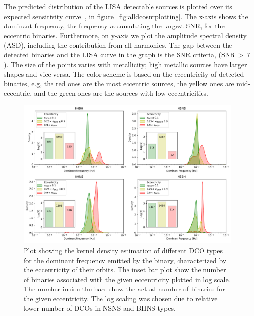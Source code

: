 \documentclass[journal, twocolumn]{IEEEtran}
\begin{document}
    The predicted distribution of the LISA detectable sources is plotted over its expected sensitivity curve~\cite{Robson2019}, in figure~\ref{fig:alldcosnrplotting}.
    The x-axis shows the dominant frequency, the frequency accumulating the largest SNR, for the eccentric binaries.
    Furthermore, on y-axis we plot the amplitude spectral density (ASD), including the contribution from all harmonics.
    The gap between the detected binaries and the LISA curve in the graph is the SNR criteria, ($\text{SNR}\,>\,7$).
    The size of the points varies with metallicity; high metallic sources have larger shapes and vice versa.
    The color scheme is based on the eccentricity of detected binaries, e.g, the red ones are the most eccentric sources, the yellow ones are mid-eccentric, and the green ones are the sources with low eccentricities.
    
    \begin{figure}[!h]
    	\centering
    	\includegraphics[width=\textwidth]{analysis_data/dco_fdom_ecc_details}
    	\caption{Plot showing the kernel density estimation of different DCO types for the dominant frequency emitted by the binary, characterized by the eccentricity of their orbits. The inset bar plot show the number of binaries associated with the given eccentricity plotted in log scale. The number inside the bars show the actual number of binaries for the given eccentricity. The log scaling was chosen due to relative lower number of DCOs in NSNS and BHNS types.}
    	\label{fig:dcofdomeccdetails}
    \end{figure}
\end{document}
